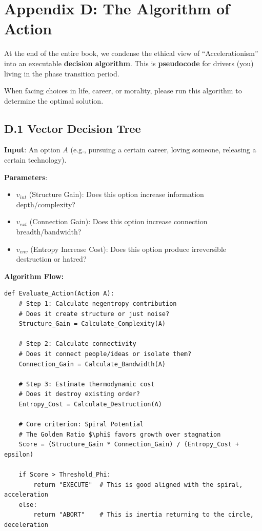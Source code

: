 \section{Appendix D: The Algorithm of Action}

At the end of the entire book, we condense the ethical view of ``Accelerationism'' into an executable \textbf{decision algorithm}. This is \textbf{pseudocode} for drivers (you) living in the phase transition period.

When facing choices in life, career, or morality, please run this algorithm to determine the optimal solution.

\subsection{D.1 Vector Decision Tree}

\textbf{Input}: An option $A$ (e.g., pursuing a certain career, loving someone, releasing a certain technology).

\textbf{Parameters}:

\begin{itemize}
\item $v_{int}$ (Structure Gain): Does this option increase information depth/complexity?

\item $v_{ext}$ (Connection Gain): Does this option increase connection breadth/bandwidth?

\item $v_{env}$ (Entropy Increase Cost): Does this option produce irreversible destruction or hatred?
\end{itemize}

\textbf{Algorithm Flow:}

\begin{verbatim}
def Evaluate_Action(Action A):
    # Step 1: Calculate negentropy contribution
    # Does it create structure or just noise?
    Structure_Gain = Calculate_Complexity(A) 
    
    # Step 2: Calculate connectivity
    # Does it connect people/ideas or isolate them?
    Connection_Gain = Calculate_Bandwidth(A)
    
    # Step 3: Estimate thermodynamic cost
    # Does it destroy existing order?
    Entropy_Cost = Calculate_Destruction(A)
    
    # Core criterion: Spiral Potential
    # The Golden Ratio $\phi$ favors growth over stagnation
    Score = (Structure_Gain * Connection_Gain) / (Entropy_Cost + epsilon)
    
    if Score > Threshold_Phi:
        return "EXECUTE"  # This is good aligned with the spiral, acceleration
    else:
        return "ABORT"    # This is inertia returning to the circle, deceleration
\end{verbatim}

